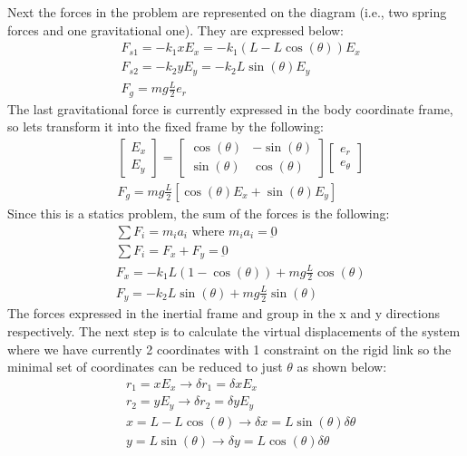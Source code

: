 \documentclass{article}
\begin{document}
Next the forces in the problem are represented on the diagram (i.e., two spring forces and one gravitational one). They are expressed below:
\begin{align*}
    & F_{s1} = -k_1 x E_x = -k_1(L - L \cos(\theta)) E_x \\
    & F_{s2} = -k_2 y E_y = -k_2 L \sin(\theta) E_y \\
    & F_g = m g \frac{L}{2} e_r 
\end{align*}
The last gravitational force is currently expressed in the body coordinate frame, so lets transform it into the fixed frame by the following:
\begin{align*}
    & \begin{bmatrix} E_x \\ E_y \end{bmatrix} = \begin{bmatrix} \cos(\theta) & -\sin(\theta) \\ \sin(\theta) & \cos(\theta) \end{bmatrix} \begin{bmatrix}e_r \\ e_{\theta}\end{bmatrix} \\
    & F_g = m g \frac{L}{2}[\cos(\theta) E_x + \sin(\theta) E_y]
\end{align*}
Since this is a statics problem, the sum of the forces is the following:
\begin{align*}
    & \sum F_i = m_i a_i \text{ where } m_i a_i = \underbar{0} \\
    & \sum F_i = F_x + F_y = \underbar{0} \\
    & F_x = -k_1 L (1 - \cos(\theta)) + m g \frac{L}{2} \cos(\theta) \\
    & F_y = -k_2 L \sin(\theta) + m g \frac{L}{2} \sin(\theta)
\end{align*}
The forces expressed in the inertial frame and group in the x and y directions respectively. The next step is to calculate the virtual displacements of the system where we have currently 2 coordinates with 1 constraint on the rigid link so the minimal set of coordinates can be reduced to just $\theta$ as shown below:
\begin{align*}
    & r_1 = x E_x \to \delta r_1 = \delta x E_x \\
    & r_2 = y E_y \to \delta r_2 = \delta y E_y \\
    & x = L - L \cos(\theta) \to \delta x = L \sin(\theta) \delta \theta \\
    & y = L \sin(\theta) \to \delta y = L \cos(\theta) \delta \theta
\end{align*}
\end{document}
